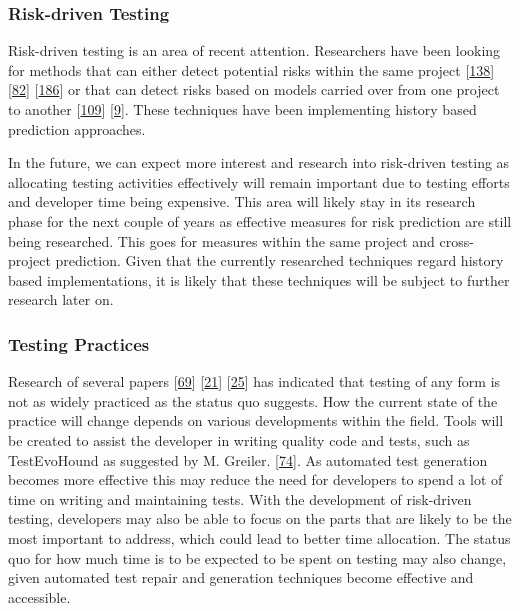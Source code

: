 \documentclass[]{book}
\begin{document}
\subsubsection{Risk-driven Testing}\label{risk-driven-testing-1}

Risk-driven testing is an area of recent attention. Researchers have
been looking for methods that can either detect potential risks within
the same project {[}\protect\hyperlink{ref-noor2015test}{138}{]}
{[}\protect\hyperlink{ref-hemmati2018}{82}{]}
{[}\protect\hyperlink{ref-vernotte2015}{186}{]} or that can detect risks
based on models carried over from one project to another
{[}\protect\hyperlink{ref-leung2015testing}{109}{]}
{[}\protect\hyperlink{ref-atifi2017}{9}{]}. These techniques have been
implementing history based prediction approaches.

In the future, we can expect more interest and research into risk-driven
testing as allocating testing activities effectively will remain
important due to testing efforts and developer time being expensive.
This area will likely stay in its research phase for the next couple of
years as effective measures for risk prediction are still being
researched. This goes for measures within the same project and
cross-project prediction. Given that the currently researched techniques
regard history based implementations, it is likely that these techniques
will be subject to further research later on.

\subsubsection{Testing Practices}\label{testing-practices}

Research of several papers
{[}\protect\hyperlink{ref-GAROUSI20131354}{69}{]}
{[}\protect\hyperlink{ref-beller2017developer}{21}{]}
{[}\protect\hyperlink{ref-beller2015}{25}{]} has indicated that testing
of any form is not as widely practiced as the status quo suggests. How
the current state of the practice will change depends on various
developments within the field. Tools will be created to assist the
developer in writing quality code and tests, such as TestEvoHound as
suggested by M. Greiler. {[}\protect\hyperlink{ref-greiler2013}{74}{]}.
As automated test generation becomes more effective this may reduce the
need for developers to spend a lot of time on writing and maintaining
tests. With the development of risk-driven testing, developers may also
be able to focus on the parts that are likely to be the most important
to address, which could lead to better time allocation. The status quo
for how much time is to be expected to be spent on testing may also
change, given automated test repair and generation techniques become
effective and accessible.
\end{document}
